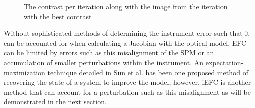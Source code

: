 \documentclass[12pt]{spieman}  %
\begin{document}
\begin{spacing}{2}
\begin{figure}[h]
    \centering
    \caption{The contrast per iteration along with the image from the iteration with the best contrast}
    \label{fig:perturbed-efc}
\end{figure}

Without sophisticated methods of determining the instrument error such that it can be accounted for when calculating a Jacobian with the optical model, EFC can be limited by errors such as this misalignment of the SPM or an accumulation of smaller perturbations within the instrument. An expectation-maximization technique detailed in Sun et al.\cite{sun-system-id-2018} has been one proposed method of recovering the state of a system to improve the model, however, iEFC is another method that can account for a perturbation such as this misalignment as will be demonstrated in the next section. 


\end{spacing}
\end{document}
